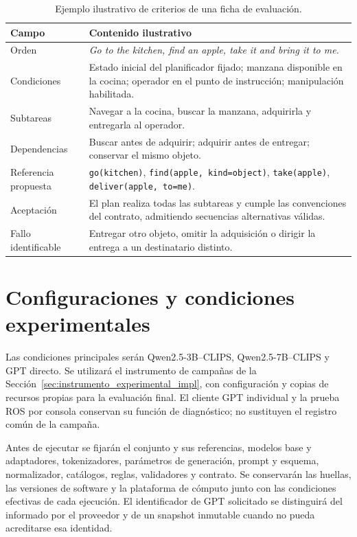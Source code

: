 \begin{table}[htbp]
\centering
\small
\caption{Ejemplo ilustrativo de criterios de una ficha de evaluación.}
\label{tab:ficha_ilustrativa_cap6}
\begin{tabularx}{\textwidth}{@{}p{}X@{}}
\toprule
\textbf{Campo} & \textbf{Contenido ilustrativo} \\
\midrule
Orden & \textit{Go to the kitchen, find an apple, take it and bring it to me.} \\
Condiciones & Estado inicial del planificador fijado; manzana disponible en la cocina; operador en el punto de instrucción; manipulación habilitada. \\
Subtareas & Navegar a la cocina, buscar la manzana, adquirirla y entregarla al operador. \\
Dependencias & Buscar antes de adquirir; adquirir antes de entregar; conservar el mismo objeto. \\
Referencia propuesta & \texttt{go(kitchen)}, \texttt{find(apple, kind=object)}, \texttt{take(apple)}, \texttt{deliver(apple, to=me)}. \\
Aceptación & El plan realiza todas las subtareas y cumple las convenciones del contrato, admitiendo secuencias alternativas válidas. \\
Fallo identificable & Entregar otro objeto, omitir la adquisición o dirigir la entrega a un destinatario distinto. \\
\bottomrule
\end{tabularx}
\end{table}

\section{Configuraciones y condiciones experimentales}
\label{sec:condiciones_cap6}

Las condiciones principales serán Qwen2.5-3B--CLIPS,
Qwen2.5-7B--CLIPS y GPT directo. Se utilizará el instrumento de campañas
de la Sección~\ref{sec:instrumento_experimental_impl}, con configuración
y copias de recursos propias para la evaluación final. El cliente GPT
individual y la prueba ROS por consola conservan su función de diagnóstico;
no sustituyen el registro común de la campaña.

Antes de ejecutar se fijarán el conjunto y sus referencias, modelos base
y adaptadores, tokenizadores, parámetros de generación, prompt y esquema,
normalizador, catálogos, reglas, validadores y contrato. Se conservarán
las huellas, las versiones de software y la plataforma de cómputo junto
con las condiciones efectivas de cada ejecución. El identificador de GPT
solicitado se distinguirá del informado por el proveedor y de un snapshot
inmutable cuando no pueda acreditarse esa identidad.

